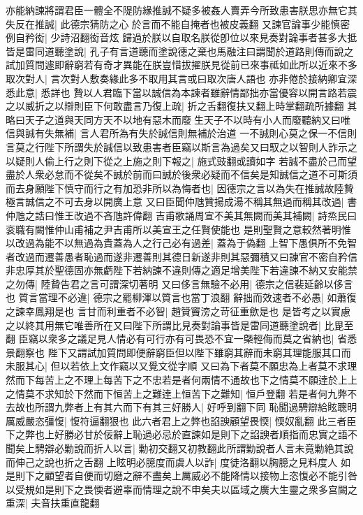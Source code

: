 亦能納諫將謂君臣一體全不隄防緣推誠不疑多被姦人賣弄今所致患害朕思亦無它其失反在推誠|{
	此德宗猜防之心於言而不能自掩者也被皮義翻}
又諫官論事少能慎密例自矜衒|{
	少詩沼翻衒音炫}
歸過於朕以自取名朕從卽位以來見奏對論事者甚多大抵皆是雷同道聽塗說|{
	孔子有言道聽而塗說德之棄也馬融注曰謂聞於道路則傳而說之}
試加質問遽即辭窮若有奇才異能在朕豈惜拔擢朕見從前已來事祗如此所以近來不多取次對人|{
	言次對人敷奏緣此多不取用其言或曰取次唐人語也}
亦非倦於接納卿宜深悉此意|{
	悉詳也}
贄以人君臨下當以誠信為本諫者雖辭情鄙拙亦當優容以開言路若震之以威折之以辯則臣下何敢盡言乃復上疏|{
	折之舌翻復扶又翻上時掌翻疏所據翻}
其略曰天子之道與天同方天不以地有惡木而廢生天子不以時有小人而廢聽納又曰唯信與誠有失無補|{
	言人君所為有失於誠信則無補於治道}
一不誠則心莫之保一不信則言莫之行陛下所謂失於誠信以致患害者臣竊以斯言為過矣又曰馭之以智則人詐示之以疑則人偷上行之則下從之上施之則下報之|{
	施式豉翻或讀如字}
若誠不盡於己而望盡於人衆必怠而不從矣不誠於前而曰誠於後衆必疑而不信矣是知誠信之道不可斯須而去身願陛下慎守而行之有加恐非所以為悔者也|{
	因德宗之言以為失在推誠故陸贄極言誠信之不可去身以開廣上意}
又曰臣聞仲虺贊揚成湯不稱其無過而稱其改過|{
	書仲虺之誥曰惟王改過不吝虺許偉翻}
吉甫歌誦周宣不美其無闕而美其補闕|{
	詩烝民曰衮職有闕惟仲山甫補之尹吉甫所以美宣王之任賢使能也}
是則聖賢之意較然著明惟以改過為能不以無過為貴蓋為人之行己必有過差|{
	蓋為于偽翻}
上智下愚俱所不免智者改過而遷善愚者恥過而遂非遷善則其德日新遂非則其惡彌積又曰諫官不密自矜信非忠厚其於聖德固亦無虧陛下若納諫不違則傳之適足增美陛下若違諫不納又安能禁之勿傳|{
	陸贄告君之言可謂深切著明}
又曰侈言無驗不必用|{
	德宗之信裴延齡以侈言也}
質言當理不必違|{
	德宗之罷柳渾以質言也當丁浪翻}
辭拙而效速者不必愚|{
	如蕭復之諫幸鳳翔是也}
言甘而利重者不必智|{
	趙贊竇滂之苛征重歛是也}
是皆考之以實慮之以終其用無它唯善所在又曰陛下所謂比見奏對論事皆是雷同道聽塗說者|{
	比毘至翻}
臣竊以衆多之議足見人情必有可行亦有可畏恐不宜一槩輕侮而莫之省納也|{
	省悉景翻察也}
陛下又謂試加質問即便辭窮臣但以陛下雖窮其辭而未窮其理能服其口而未服其心|{
	但以若依上文作竊以又覺文從字順}
又曰為下者莫不願忠為上者莫不求理然而下每苦上之不理上每苦下之不忠若是者何兩情不通故也下之情莫不願逹於上上之情莫不求知於下然而下恒苦上之難逹上恒苦下之難知|{
	恒戶登翻}
若是者何九弊不去故也所謂九弊者上有其六而下有其三好勝人|{
	好呼到翻下同}
恥聞過騁辯給眩聰明厲威嚴恣彊愎|{
	愎符逼翻狠也}
此六者君上之弊也諂諛顧望畏愞|{
	愞奴亂翻}
此三者臣下之弊也上好勝必甘於佞辭上恥過必忌於直諫如是則下之諂諛者順指而忠實之語不聞矣上騁辯必勦說而折人以言|{
	勦初交翻又初教翻此所謂勦說者人言未竟勦絶其說而伸己之說也折之舌翻}
上眩明必臆度而虞人以詐|{
	度徒洛翻以胸臆之見料度人}
如是則下之顧望者自便而切磨之辭不盡矣上厲威必不能降情以接物上恣愎必不能引咎以受規如是則下之畏愞者避辜而情理之說不申矣夫以區域之廣大生靈之衆多宫闕之重深|{
	夫音扶重直龍翻}
